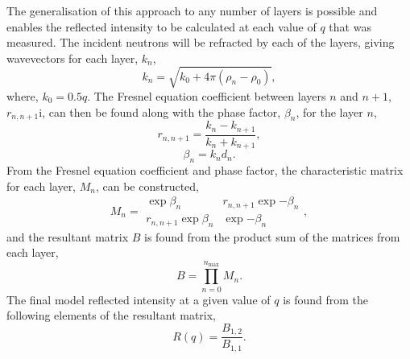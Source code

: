 \documentclass[twoside,symmetric]{tufte-handout}
\begin{document}
The generalisation of this approach to any number of layers is possible and enables the reflected intensity to be calculated at each value of $q$ that was measured. 
The incident neutrons will be refracted by each of the layers, giving wavevectors for each layer, $k_n$, 
%
\begin{equation}
    k_n = \sqrt{k_0+4\pi(\rho_n - \rho_0)},
\end{equation}
%
where, $k_0 = 0.5q$. 
The Fresnel equation coefficient between layers $n$ and $n+1$, $r_{n, n+1}$i, can then be found along with the phase factor, $\beta_n$, for the layer $n$, 
%
\begin{equation}
    r_{n, n+1} = \frac{k_n - k_{n+1}}{k_n + k_{n+1}}, 
    \label{equ:fres}
\end{equation}
%
%
\begin{equation}
    \beta_n = k_nd_n.
\end{equation}
%
From the Fresnel equation coefficient and phase factor, the characteristic matrix for each layer, $M_n$, can be constructed, 
%
\begin{equation}
    M_n = 
    \begin{matrix}
        \exp{\beta_n} & r_{n,n+1}\exp{-\beta_n} \\ 
        r_{n,n+1}\exp{\beta_n} & \exp{-\beta_n}
    \end{matrix},
\end{equation}
%
and the resultant matrix $B$ is found from the product sum of the matrices from each layer, 
%
\begin{equation}
    B = \prod_{n=0}^{n_{\text{max}}}{M_n}.
\end{equation}
%
The final model reflected intensity at a given value of $q$ is found from the following elements of the resultant matrix, 
%
\begin{equation}
    R(q) = \frac{B_{1,2}}{B_{1,1}}. 
\end{equation}
%
\end{document}

